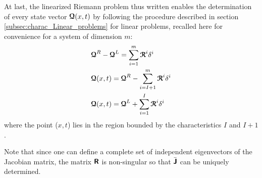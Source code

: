 At last, the linearized Riemann problem thus written enables the determination of every state vector ${\boldsymbol{\mathcal{Q}}}(x,t)$ by following the procedure described in section \ref{subsec:charac_Linear_problems} for linear problems, recalled here for convenience for a system of dimension $m$:
\begin{equation}
  \label{eq:approx_RS}
  \begin{aligned}
    &  {\boldsymbol{\mathcal{Q}}}^R-{\boldsymbol{\mathcal{Q}}}^L=\sum_{i=1}^{m} {\boldsymbol{\mathcal{R}}}^i\delta^i \\
    &  {\boldsymbol{\mathcal{Q}}}(x,t) ={\boldsymbol{\mathcal{Q}}}^R -\sum_{i=I+1}^{m} {\boldsymbol{\mathcal{R}}}^i\delta^i \\
    &  {\boldsymbol{\mathcal{Q}}}(x,t) ={\boldsymbol{\mathcal{Q}}}^L+ \sum_{i=1}^{I} {\boldsymbol{\mathcal{R}}}^i\delta^i
  \end{aligned}
\end{equation}
where the point ($x,t$) lies in the region bounded by the characteristics $I$ and $I+1$.

\begin{remark}
  Note that since one can define a complete set of independent eigenvectors of the Jacobian matrix, the matrix $\boldsymbol{\mathsf{R}}$ is non-singular so that $\bar{\boldsymbol{\mathsf{J}}}$ can be uniquely determined.
\end{remark}

